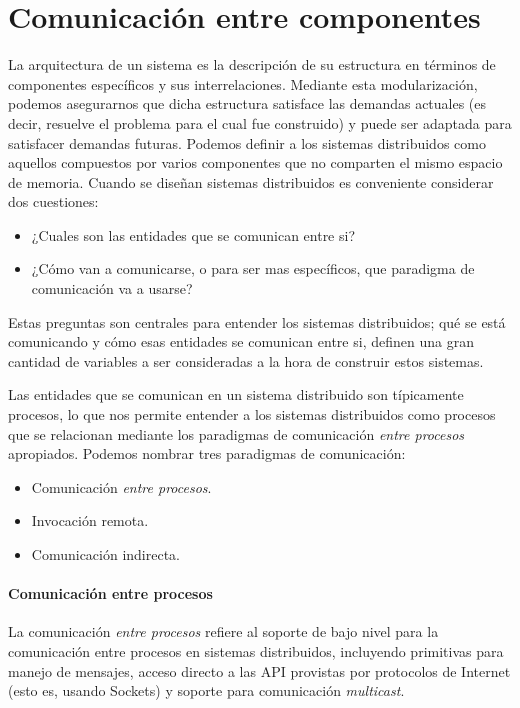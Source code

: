 \documentclass[a4paper,10pt, oneside]{article}
\begin{document}
\section{Comunicación entre componentes}
La arquitectura de un sistema es la descripción de su estructura en términos de componentes específicos y sus interrelaciones. Mediante esta modularización, podemos asegurarnos que dicha estructura satisface las demandas actuales (es decir, resuelve el problema para el cual fue construido) y puede ser adaptada para satisfacer demandas futuras.
Podemos definir a los sistemas distribuidos como aquellos compuestos por varios componentes que no comparten el mismo espacio de memoria\cite{Muhl:2006:DES:1162246}. Cuando se diseñan sistemas distribuidos es conveniente considerar dos cuestiones: 

\begin{itemize}
	\item ¿Cuales son las entidades que se comunican entre si?
	\item ¿Cómo van a comunicarse, o para ser mas específicos, que paradigma de comunicación va a usarse?
\end{itemize}

Estas preguntas son centrales para entender los sistemas distribuidos; qué se está comunicando y cómo esas entidades se comunican entre si, definen una gran cantidad de variables a ser consideradas a la hora de construir estos sistemas.

Las entidades que se comunican en un sistema distribuido son típicamente procesos, lo que nos permite entender a los sistemas distribuidos como procesos que se relacionan mediante los paradigmas de comunicación \textit{entre procesos} apropiados. Podemos nombrar tres paradigmas de comunicación:

\begin{itemize}
	\item Comunicación \textit{entre procesos}.
	\item Invocación remota.
	\item Comunicación indirecta.
\end{itemize}

\paragraph{Comunicación entre procesos}
La comunicación \textit{entre procesos} refiere al soporte de bajo nivel para la comunicación entre procesos en sistemas distribuidos, incluyendo primitivas para manejo de mensajes, acceso directo a las API provistas por protocolos de Internet (esto es, usando Sockets) y soporte para comunicación \textit{multicast}.
\end{document}
